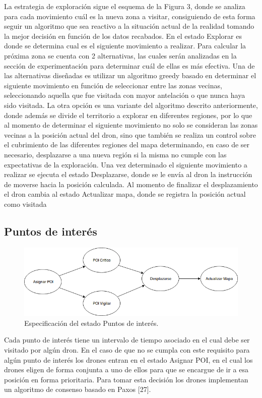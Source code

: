 La estrategia de exploración sigue el esquema de la Figura 3, donde se analiza para cada movimiento cuál es la nueva zona a visitar, consiguiendo de esta forma seguir un algoritmo que sea reactivo a la situación actual de la realidad tomando la mejor decisión en función de los datos recabados.
En el estado Explorar es donde se determina cual es el siguiente movimiento a realizar. Para calcular la próxima zona se cuenta con 2 alternativas, las cuales serán analizadas en la sección de experimentación para determinar cuál de ellas es más efectiva. Una de las alternativas diseñadas es utilizar un algoritmo greedy basado en determinar el siguiente movimiento en función de seleccionar entre las zonas vecinas, seleccionando aquella que fue visitada con mayor antelación o que nunca haya sido visitada. La otra opción es una variante del algoritmo descrito anteriormente, donde además se divide el territorio a explorar en diferentes regiones, por lo que al momento de determinar el siguiente movimiento no solo se consideran las zonas vecinas a la posición actual del dron, sino que también se realiza un control sobre el cubrimiento de las diferentes regiones del mapa determinando, en caso de ser necesario, desplazarse a una nueva región si la misma no cumple con las expectativas de la exploración.
Una vez determinado el siguiente movimiento a realizar se ejecuta el estado Desplazarse, donde se le envía al dron la instrucción de moverse hacia la posición calculada.
Al momento de finalizar el desplazamiento el dron cambia al estado Actualizar mapa, donde se registra la posición actual como visitada 

\subsection {Puntos de interés}

\begin{figure}[h!]
	\label{fig:comp}
	\includegraphics[width=.8\textwidth]{imagenes/chap5/image4}
	\caption{Especificación del estado Puntos de interés.}
\end{figure}

Cada punto de interés tiene un intervalo de tiempo asociado en el cual debe ser visitado por algún dron. En el caso de que no se cumpla con este requisito para algún punto de interés los drones entran en el estado Asignar POI, en el cual los drones eligen de forma conjunta a uno de ellos para que se encargue de ir a esa posición en forma prioritaria. Para tomar esta decisión los drones implementan un algoritmo de consenso basado en Paxos [27].



